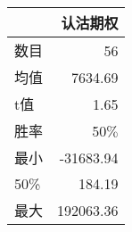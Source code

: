 \begin{tabular}{lr}
\toprule
{} &              认沽期权 \\
\midrule
数目 &      56\\
均值  &    7634.69 \\
t值   &   1.65\\
胜率 & 50$\%$\\
最小   &  -31683.94 \\
50\%   &     184.19 \\
最大  &  192063.36 \\
\bottomrule
\end{tabular}
